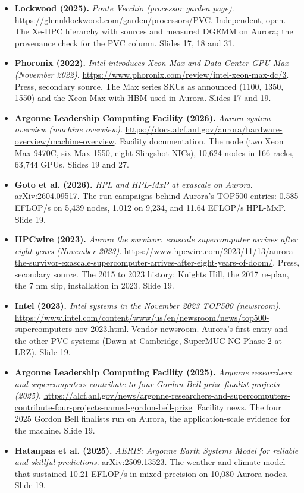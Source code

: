 \begin{itemize}[leftmargin=1.2em,itemsep=3pt]
\item \textbf{Lockwood (2025).} \textit{Ponte Vecchio (processor garden page)}. \url{https://glennklockwood.com/garden/processors/PVC}. Independent, open. The Xe-HPC hierarchy with sources and measured DGEMM on Aurora; the provenance check for the PVC column. Slides 17, 18 and 31.
\item \textbf{Phoronix (2022).} \textit{Intel introduces Xeon Max and Data Center GPU Max (November 2022)}. \url{https://www.phoronix.com/review/intel-xeon-max-dc/3}. Press, secondary source. The Max series SKUs as announced (1100, 1350, 1550) and the Xeon Max with HBM used in Aurora. Slides 17 and 19.
\item \textbf{Argonne Leadership Computing Facility (2026).} \textit{Aurora system overview (machine overview)}. \url{https://docs.alcf.anl.gov/aurora/hardware-overview/machine-overview}. Facility documentation. The node (two Xeon Max 9470C, six Max 1550, eight Slingshot NICs), 10,624 nodes in 166 racks, 63,744 GPUs. Slides 19 and 27.
\item \textbf{Goto et al. (2026).} \textit{HPL and HPL-MxP at exascale on Aurora}. arXiv:2604.09517. The run campaigns behind Aurora's TOP500 entries: 0.585 EFLOP/s on 5,439 nodes, 1.012 on 9,234, and 11.64 EFLOP/s HPL-MxP. Slide 19.
\item \textbf{HPCwire (2023).} \textit{Aurora the survivor: exascale supercomputer arrives after eight years (November 2023)}. \url{https://www.hpcwire.com/2023/11/13/aurora-the-survivor-exascale-supercomputer-arrives-after-eight-years-of-doom/}. Press, secondary source. The 2015 to 2023 history: Knights Hill, the 2017 re-plan, the 7 nm slip, installation in 2023. Slide 19.
\item \textbf{Intel (2023).} \textit{Intel systems in the November 2023 TOP500 (newsroom)}. \url{https://www.intel.com/content/www/us/en/newsroom/news/top500-supercomputers-nov-2023.html}. Vendor newsroom. Aurora's first entry and the other PVC systems (Dawn at Cambridge, SuperMUC-NG Phase 2 at LRZ). Slide 19.
\item \textbf{Argonne Leadership Computing Facility (2025).} \textit{Argonne researchers and supercomputers contribute to four Gordon Bell prize finalist projects (2025)}. \url{https://alcf.anl.gov/news/argonne-researchers-and-supercomputers-contribute-four-projects-named-gordon-bell-prize}. Facility news. The four 2025 Gordon Bell finalists run on Aurora, the application-scale evidence for the machine. Slide 19.
\item \textbf{Hatanpaa et al. (2025).} \textit{AERIS: Argonne Earth Systems Model for reliable and skillful predictions}. arXiv:2509.13523. The weather and climate model that sustained 10.21 EFLOP/s in mixed precision on 10,080 Aurora nodes. Slide 19.

\end{itemize}
